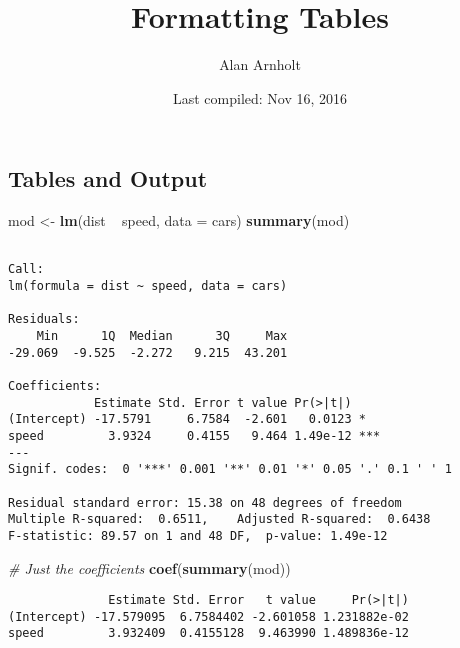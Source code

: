 \documentclass[]{article}
\title{Formatting Tables}
\author{Alan Arnholt}
\date{Last compiled: Nov 16, 2016}
\newenvironment{Shaded}{\begin{snugshade}}{\end{snugshade}}
\newcommand{\KeywordTok}[1]{\textcolor[rgb]{0.13,0.29,0.53}{\textbf{{#1}}}}
\newcommand{\DataTypeTok}[1]{\textcolor[rgb]{0.13,0.29,0.53}{{#1}}}
\newcommand{\StringTok}[1]{\textcolor[rgb]{0.31,0.60,0.02}{{#1}}}
\newcommand{\CommentTok}[1]{\textcolor[rgb]{0.56,0.35,0.01}{\textit{{#1}}}}
\newcommand{\NormalTok}[1]{{#1}}
\begin{document}
\maketitle

{
\setcounter{tocdepth}{2}
\tableofcontents
}
\subsection*{Tables and Output}\label{tables-and-output}

\begin{Shaded}
\begin{Highlighting}[]
\NormalTok{mod <-}\StringTok{ }\KeywordTok{lm}\NormalTok{(dist ~}\StringTok{ }\NormalTok{speed, }\DataTypeTok{data =} \NormalTok{cars)}
\KeywordTok{summary}\NormalTok{(mod)}
\end{Highlighting}
\end{Shaded}

\begin{verbatim}

Call:
lm(formula = dist ~ speed, data = cars)

Residuals:
    Min      1Q  Median      3Q     Max 
-29.069  -9.525  -2.272   9.215  43.201 

Coefficients:
            Estimate Std. Error t value Pr(>|t|)    
(Intercept) -17.5791     6.7584  -2.601   0.0123 *  
speed         3.9324     0.4155   9.464 1.49e-12 ***
---
Signif. codes:  0 '***' 0.001 '**' 0.01 '*' 0.05 '.' 0.1 ' ' 1

Residual standard error: 15.38 on 48 degrees of freedom
Multiple R-squared:  0.6511,    Adjusted R-squared:  0.6438 
F-statistic: 89.57 on 1 and 48 DF,  p-value: 1.49e-12
\end{verbatim}

\begin{Shaded}
\begin{Highlighting}[]
\CommentTok{# Just the coefficients}
\KeywordTok{coef}\NormalTok{(}\KeywordTok{summary}\NormalTok{(mod))}
\end{Highlighting}
\end{Shaded}

\begin{verbatim}
              Estimate Std. Error   t value     Pr(>|t|)
(Intercept) -17.579095  6.7584402 -2.601058 1.231882e-02
speed         3.932409  0.4155128  9.463990 1.489836e-12
\end{verbatim}

\begin{Shaded}
\end{Shaded}
\end{document}
